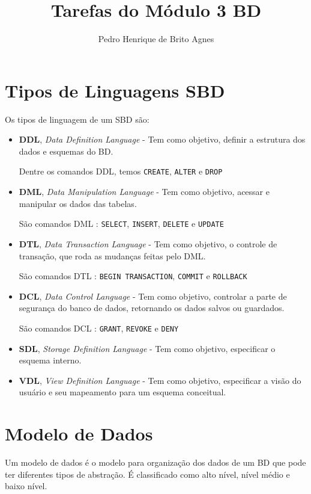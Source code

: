 \documentclass[12pt]{article}
\begin{document}
\title{Tarefas do Módulo 3 BD}
\author{Pedro Henrique de Brito Agnes}

\maketitle

\setcounter{section}{14}
\section{Tipos de Linguagens SBD}
Os tipos de linguagem de um SBD são:
\begin{itemize}

\item
\textbf{DDL}, \textit{Data Definition Language} - Tem como objetivo, definir a estrutura dos dados e esquemas do BD.

Dentre os comandos DDL, temos \texttt{CREATE}, \texttt{ALTER} e \texttt{DROP}

\item
\textbf{DML}, \textit{Data Manipulation Language} - Tem como objetivo, acessar e manipular os dados das tabelas.

São comandos DML : \texttt{SELECT}, \texttt{INSERT}, \texttt{DELETE} e \texttt{UPDATE}

\item
\textbf{DTL}, \textit{Data Transaction Language} - Tem como objetivo, o controle de transação, que roda as mudanças feitas pelo DML.

São comandos DTL : \texttt{BEGIN TRANSACTION}, \texttt{COMMIT} e \texttt{ROLLBACK}

\item
\textbf{DCL}, \textit{Data Control Language} - Tem como objetivo, controlar a parte de segurança do banco de dados, retornando os dados salvos ou guardados.

São comandos DCL : \texttt{GRANT}, \texttt{REVOKE} e \texttt{DENY}

\item 
\textbf{SDL}, \textit{Storage Definition Language} - Tem como objetivo, especificar o esquema interno.

\item
\textbf{VDL}, \textit{View Definition Language} - Tem como objetivo, especificar a visão do usuário e seu mapeamento para um esquema conceitual.

\end{itemize}

\section{Modelo de Dados}
Um modelo de dados é o modelo para organização dos dados de um BD que pode ter diferentes tipos de abstração. É classificado como alto nível, nível médio e baixo nível.
\end{document}
